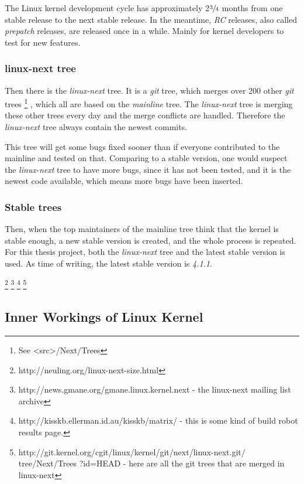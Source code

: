 \documentclass[a4paper,11pt]{article}
\begin{document}
The Linux kernel development cycle has approximately 2$\sfrac{3}{4}$ months 
from one stable release to the next stable release.
    \cite{crystalball}
In the meantime, \emph{RC} 
releases, also called \emph{prepatch} releases, are released once in a while. 
Mainly for kernel developers to test for new features. 


        \subsubsection{linux-next tree}

Then there is the \emph{linux-next} tree. It is a \emph{git} tree, which 
merges over 200 other \emph{git} trees
    \footnote{See <src>/Next/Trees}
, which 
all are based on the \emph{mainline} tree. The \emph{linux-next} tree is 
merging these other trees every day and the merge conflicts are handled. 
Therefore the \emph{linux-next} tree always contain the newest commits. 

This tree will get some bugs fixed sooner than if everyone contributed to the 
mainline and tested on that. Comparing to a stable version, one would suspect 
the \emph{linux-next} tree to have more bugs, since it has not been tested, 
and it is the newest code available, which means more bugs have been inserted. 


        \subsubsection{Stable trees}

Then, when the top maintainers of the mainline tree think that the kernel is 
stable enough, a new stable version is created, and the whole process is 
repeated.
\\

For this thesis project, both the \emph{linux-next} tree and the latest stable 
version is used. As time of writing, the latest stable version is \emph{4.1.1}.

    \footnote{http://neuling.org/linux-next-size.html}
    \footnote{http://news.gmane.org/gmane.linux.kernel.next - the linux-next 
        mailing list archive}
    \footnote{http://kisskb.ellerman.id.au/kisskb/matrix/ - this is some kind of 
        build robot results page.}
    \footnote{
        http://git.kernel.org/cgit/linux/kernel/git/next/linux-next.git/
        tree/Next/Trees ?id=HEAD - here are all the git trees that are merged 
        in linux-next}


        \subsection{Inner Workings of Linux Kernel}
\end{document}
